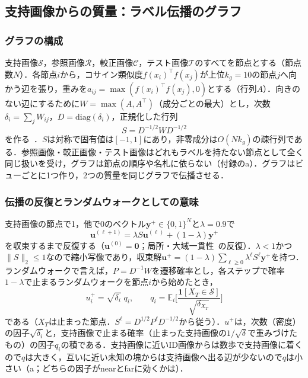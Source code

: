 \subsection{支持画像からの質量：ラベル伝播のグラフ}
\label{sec:graph}
\subsubsection{グラフの構成}
支持画像$\mathcal{S}$，参照画像$\mathcal{R}$，較正画像$\mathcal{C}$，テスト画像$\mathcal{T}$のすべてを節点とする（節点数$N$）．各節点$i$から，コサイン類似度$f(x_i)^{\top}f(x_j)$が上位$k_g{=}10$の節点$j$へ向かう辺を張り，重みを$a_{ij}=\max(f(x_i)^{\top}f(x_j),0)$とする（行列$A$）．向きのない辺にするために$W=\max(A,A^{\top})$（成分ごとの最大）とし，次数$\delta_i=\sum_jW_{ij}$，$D=\mathrm{diag}(\delta_i)$，正規化した行列
\begin{equation}
S=D^{-1/2}WD^{-1/2}
\label{eq:S}
\end{equation}
を作る~\cite{zhou2004lgc}．$S$は対称で固有値は$[-1,1]$にあり，非零成分は$O(Nk_g)$の疎行列である．参照画像・較正画像・テスト画像はどれもラベルを持たない節点として全く同じ扱いを受け，グラフは節点の順序や名札に依らない（付録のa）．グラフはビューごとに1つ作り，2つの質量を同じグラフで伝播させる．

\subsubsection{伝播の反復とランダムウォークとしての意味}
支持画像の節点で1，他で0のベクトル$\mathbf{y}^{+}\in\{0,1\}^{N}$と$\lambda{=}0.9$で
\begin{equation}
\mathbf{u}^{(\ell+1)}=\lambda S\mathbf{u}^{(\ell)}+(1-\lambda)\mathbf{y}^{+}
\label{eq:lp}
\end{equation}
を収束するまで反復する（$\mathbf{u}^{(0)}=\mathbf{0}$；局所・大域一貫性~\cite{zhou2004lgc}の反復）．$\lambda<1$かつ$\|S\|_2\le1$なので縮小写像であり，収束解$\mathbf{u}^{+}=(1-\lambda)\sum_{\ell\ge0}\lambda^{\ell}S^{\ell}\mathbf{y}^{+}$を持つ．ランダムウォークで言えば，$P=D^{-1}W$を遷移確率とし，各ステップで確率$1-\lambda$で止まるランダムウォークを節点$i$から始めたとき，
\begin{equation}
u^{+}_i=\sqrt{\delta_i}\;q_i,\qquad q_i=\mathbb{E}_i\Big[\frac{\mathbf{1}[X_T\in\mathcal{S}]}{\sqrt{\delta_{X_T}}}\Big]
\label{eq:walk}
\end{equation}
である（$X_T$は止まった節点．$S^{\ell}=D^{1/2}P^{\ell}D^{-1/2}$から従う）．$u^{+}$は，次数（密度）の因子$\sqrt{\delta_i}$と，支持画像で止まる確率（止まった支持画像の$1/\sqrt{\delta}$で重みづけたもの）の因子$q_i$の積である．支持画像に近いID画像からは数歩で支持画像に着くので$q$は大きく，互いに近い未知の塊からは支持画像へ出る辺が少ないので$q$は小さい（a；どちらの因子がnearとfarに効くかは）．

